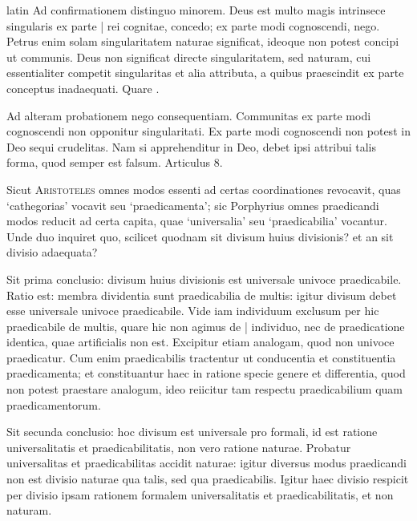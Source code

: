 \begin{otherlanguage*}{latin}
\pstart
  Ad confirmationem distinguo minorem. Deus est multo magis intrinsece singularis ex parte \textnormal{|}   rei cognitae, concedo; ex parte modi cognoscendi, nego. Petrus enim solam singularitatem naturae significat, ideoque non potest concipi ut communis. Deus non significat directe singularitatem, sed naturam, cui essentialiter competit singularitas et alia attributa, a quibus praescindit ex parte conceptus inadaequati. Quare  . 
\pend

\pstart
  Ad alteram probationem nego consequentiam. Communitas ex parte modi cognoscendi non opponitur singularitati. Ex parte modi cognoscendi non potest in Deo sequi crudelitas. Nam si apprehenditur in Deo, debet ipsi attribui talis forma, quod semper est falsum. Articulus 8. 
\pend

        \pstart
        \pend
      
\pstart
  Sicut \textsc{Aristoteles} omnes modos essenti ad certas coordinationes revocavit, quas `cathegorias' vocavit seu `praedicamenta'; sic Porphyrius omnes praedicandi modos reducit ad certa capita, quae `universalia' seu `praedicabilia' vocantur. Unde duo inquiret quo, scilicet quodnam sit divisum huius divisionis? et an sit divisio adaequata? 
\pend

\pstart
  Sit prima conclusio: divisum huius divisionis est universale univoce praedicabile. Ratio est: membra dividentia sunt praedicabilia de multis: igitur divisum debet esse universale univoce praedicabile. Vide iam individuum exclusum per hic praedicabile de multis, quare hic non agimus de \textnormal{|} individuo, nec de praedicatione identica, quae artificialis non est. Excipitur etiam analogam, quod non univoce praedicatur. Cum enim praedicabilis tractentur ut conducentia et constituentia praedicamenta; et constituantur haec in ratione specie genere et differentia, quod non potest praestare analogum, ideo reiicitur tam respectu praedicabilium quam praedicamentorum. 
\pend

\pstart
  Sit secunda conclusio: hoc divisum est universale pro formali, id est ratione universalitatis et praedicabilitatis, non vero ratione naturae. Probatur universalitas et praedicabilitas accidit naturae: igitur diversus modus praedicandi non est divisio naturae qua talis, sed qua praedicabilis. Igitur haec divisio respicit per divisio ipsam rationem formalem universalitatis et praedicabilitatis, et non naturam. 
\pend


\end{otherlanguage*}
